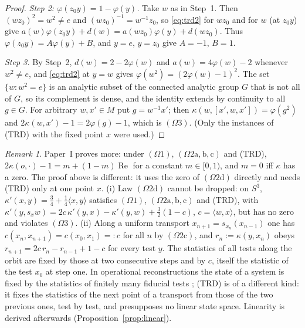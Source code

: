 \documentclass[aps,pra,onecolumn,superscriptaddress,nofootinbib,10pt]{revtex4-2}
\theoremstyle{definition}
\theoremstyle{remark}
\newtheorem{remark}[theorem]{Remark}
\newcommand{\re}{\operatorname{Re}}
\newcommand{\ip}[2]{\langle #1,#2\rangle}
\newcommand{\hp}[3]{[#1,#2,#3]}
\begin{document}
\begin{proof}
\emph{Step 2: $\varphi(z_0y)=1-\varphi(y)$.}  Take $w$ as in Step~1.  Then $(wz_0)^2=w^2\ne e$ and
$(wz_0)^{-1}=w^{-1}z_0$, so \eqref{eq:trd2} for $wz_0$ and for $w$ (at $z_0y$) give
$a(w)\varphi(z_0y)+d(w)=a(wz_0)\varphi(y)+d(wz_0)$.  Thus $\varphi(z_0y)=A\varphi(y)+B$, and $y=e$,
$y=z_0$ give $A=-1$, $B=1$.

\emph{Step 3.}  By Step~2, $d(w)=2-2\varphi(w)$ and $a(w)=4\varphi(w)-2$ whenever $w^2\ne e$, and
\eqref{eq:trd2} at $y=w$ gives $\varphi(w^2)=(2\varphi(w)-1)^2$.  The set $\{w:w^2=e\}$ is an analytic
subset of the connected analytic group $G$ that is not all of $G$, so its complement is dense, and the
identity extends by continuity to all $g\in G$.  For arbitrary $w,x'\in M$ put $g=w^{-1}x'$; then
$\kappa(w,\hp{x'}{w}{x'})=\varphi(g^2)$ and $2\kappa(w,x')-1=2\varphi(g)-1$, which is $(\Omega3)$.  (Only
the instances of (TRD) with the fixed point $x$ were used.)
\end{proof}

\begin{remark}\label{rem:trd}
Paper~I \cite[Thm.~4.5]{PaperI} proves more: under $(\Omega1)$, $(\Omega2\mathrm{a,b,c})$ and (TRD),
$2\kappa(o,\cdot)-1=m+(1-m)\re$ for a constant $m\in[0,1)$, and $m=0$ iff $\kappa$ has a zero.  The proof
above is different: it uses the zero of $(\Omega2\mathrm d)$ directly and needs (TRD) only at one point
$x$.
(i) Law $(\Omega2\mathrm d)$ cannot be dropped: on $S^3$, $\kappa'(x,y)=\tfrac34+\tfrac14\ip{x}{y}$
satisfies $(\Omega1)$, $(\Omega2\mathrm{a,b,c})$ and (TRD), with
$\kappa'(y,s_xw)=2c\,\kappa'(y,x)-\kappa'(y,w)+\tfrac32(1-c)$, $c=\ip{w}{x}$, but has no zero and
violates $(\Omega3)$.
(ii) Along a uniform transport $x_{n+1}=s_{x_n}(x_{n-1})$ one has $c(x_n,x_{n+1})=c(x_0,x_1)=:c$ for all
$n$ by $(\Omega2\mathrm c)$, and $r_n:=\kappa(y,x_n)$ obeys $r_{n+1}=2c\,r_n-r_{n-1}+1-c$ for every test
$y$.  The statistics of all tests along the orbit are fixed by those at two consecutive steps and by
$c$, itself the statistic of the test $x_0$ at step one.  In operational reconstructions the state of
a system is fixed by the statistics of finitely many fiducial tests \cite{Hardy,MM}; (TRD) is of a
different kind: it fixes the statistics of the next point of a transport from those of the two
previous ones, test by test, and presupposes no linear state space.  Linearity is derived afterwards
(Proposition~\ref{prop:linear}).
\end{remark}
\end{document}
